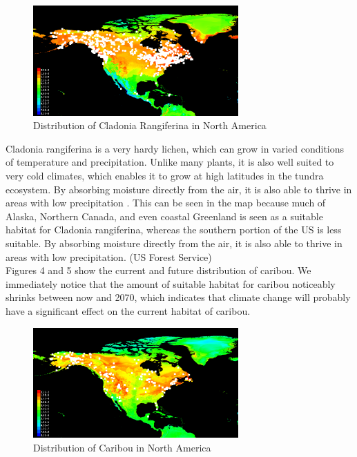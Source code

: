 \documentclass[twoside]{article}
\begin{document}
\begin{figure}[h!]
\centering
\includegraphics[width=0.7\textwidth]{NCladoniaFuture}
\caption{Distribution of Cladonia Rangiferina in North America}
\end{figure}

Cladonia rangiferina is a very hardy lichen, which can grow in varied conditions
of temperature and precipitation. Unlike many plants, it is also well suited
to very cold climates, which enables it to grow at high latitudes in the
tundra ecosystem. By absorbing moisture directly from the air, it is also able
to thrive in areas with low precipitation \cite{usfs}. This can be
seen in the map because much of Alaska, Northern Canada, and even coastal
Greenland is seen as a suitable habitat for Cladonia rangiferina, whereas
the southern portion of the US is less suitable. By absorbing moisture
directly from the air, it is also able to thrive in areas with low
precipitation. (US Forest Service)\\

Figures 4 and 5 show the current and future distribution of caribou. We
immediately notice that the amount of suitable habitat for caribou noticeably
shrinks between now and 2070, which indicates that climate change will probably
have a significant effect on the current habitat of caribou.

\begin{figure}[h!]
\centering
\includegraphics[width=0.7\textwidth]{NCaribouPresent}
\caption{Distribution of Caribou in North America}
\end{figure}
\end{document}
